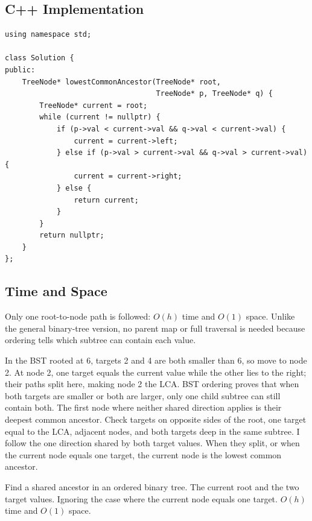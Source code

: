 \subsection{C++ Implementation}
\begin{lstlisting}[style=compactcode,caption={Complete C++ solution: LCA of a BST}]
using namespace std;

class Solution {
public:
    TreeNode* lowestCommonAncestor(TreeNode* root,
                                   TreeNode* p, TreeNode* q) {
        TreeNode* current = root;
        while (current != nullptr) {
            if (p->val < current->val && q->val < current->val) {
                current = current->left;
            } else if (p->val > current->val && q->val > current->val) {
                current = current->right;
            } else {
                return current;
            }
        }
        return nullptr;
    }
};
\end{lstlisting}

\subsection{Time and Space}
Only one root-to-node path is followed: \(O(h)\) time and \(O(1)\) space.
Unlike the general binary-tree version, no parent map or full traversal is
needed because ordering tells which subtree can contain each value.

\lessonexpansion
  {In the BST rooted at 6, targets 2 and 4 are both smaller than 6, so move to
   node 2. At node 2, one target equals the current value while the other lies
   to the right; their paths split here, making node 2 the LCA.}
  {BST ordering proves that when both targets are smaller or both are larger,
   only one child subtree can still contain both. The first node where neither
   shared direction applies is their deepest common ancestor.}
  {Check targets on opposite sides of the root, one target equal to the LCA,
   adjacent nodes, and both targets deep in the same subtree.}
  {I follow the one direction shared by both target values. When they split,
   or when the current node equals one target, the current node is the lowest
   common ancestor.}

\chaptercheckpoint
  {Find a shared ancestor in an ordered binary tree.}
  {The current root and the two target values.}
  {Ignoring the case where the current node equals one target.}
  {$O(h)$ time and $O(1)$ space.}



